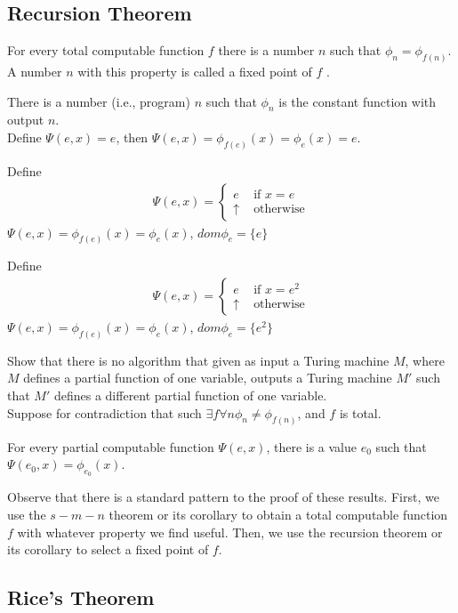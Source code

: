 \subsection{Recursion Theorem}

 For every total computable function $f$ there is a number
$n$
such that $\phi_n = \phi_{f(n)}$. A number $n$ with this property is called a
fixed point of $f$ .

 There is a number (i.e., program) $n$ such that $\phi_n$ is the
constant function with output $n$.\\
Define $\Psi(e,x)=e$, then $\Psi(e,x)=\phi_{f(e)}(x)=\phi_e(x) = e$.

 Define
\begin{align*}
  \Psi(e,x)=
  \begin{cases}
    e & \text{ if } x = e \\
    \uparrow & \text{ otherwise}
  \end{cases}
\end{align*}
$\Psi(e,x)=\phi_{f(e)}(x)=\phi_e(x)$, $dom\phi_e = \{e\}$

 Define
\begin{align*}
  \Psi(e,x)=
  \begin{cases}
    e & \text{ if } x = e^2 \\
    \uparrow & \text{ otherwise}
  \end{cases}
\end{align*}
$\Psi(e,x)=\phi_{f(e)}(x)=\phi_e(x)$, $dom\phi_e = \{e^2\}$

 Show that there is no algorithm that given as input a Turing 
machine $M$, where $M$ defines a partial function of one variable, outputs
a Turing machine $M'$ such that $M'$ defines a different partial function of one
variable.\\
Suppose for contradiction that such $\exists f \forall n \phi_n \ne
\phi_{f(n)}$, and $f$ is total.

 For every partial computable function $\Psi(e, x)$, there is a
value $e_0$ such that $\Psi(e_0,x) = \phi_{e_0}(x)$.

Observe that there is a standard pattern to the proof of these results. First,
we use the $s-m-n$ theorem or its corollary to obtain a total computable
function $f$ with whatever property we find useful. Then, we use the recursion theorem or its
corollary to select a fixed point of $f$.


\subsection{Rice's Theorem}

